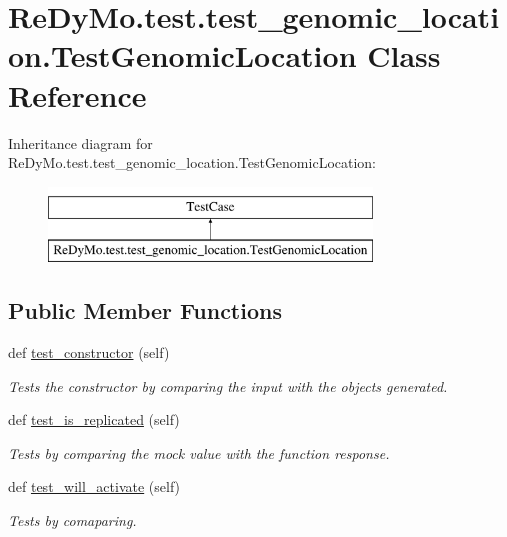 \hypertarget{classReDyMo_1_1test_1_1test__genomic__location_1_1TestGenomicLocation}{}\section{Re\+Dy\+Mo.\+test.\+test\+\_\+genomic\+\_\+location.\+Test\+Genomic\+Location Class Reference}
\label{classReDyMo_1_1test_1_1test__genomic__location_1_1TestGenomicLocation}
Inheritance diagram for Re\+Dy\+Mo.\+test.\+test\+\_\+genomic\+\_\+location.\+Test\+Genomic\+Location\+:\begin{figure}[H]
\begin{center}
\leavevmode
\includegraphics[height=2.000000cm]{classReDyMo_1_1test_1_1test__genomic__location_1_1TestGenomicLocation}
\end{center}
\end{figure}
\subsection*{Public Member Functions}
\begin{DoxyCompactItemize}
\item 
def \mbox{\hyperlink{classReDyMo_1_1test_1_1test__genomic__location_1_1TestGenomicLocation_add11474b7703287f0d310ccb016cfec0}{test\+\_\+constructor}} (self)
\begin{DoxyCompactList}\small\item\em Tests the constructor by comparing the input with the objects generated. \end{DoxyCompactList}\item 
def \mbox{\hyperlink{classReDyMo_1_1test_1_1test__genomic__location_1_1TestGenomicLocation_ada2ce7fa847394f77b6db3f9b1f28445}{test\+\_\+is\+\_\+replicated}} (self)
\begin{DoxyCompactList}\small\item\em Tests by comparing the mock value with the function response. \end{DoxyCompactList}\item 
\mbox{\label{classReDyMo_1_1test_1_1test__genomic__location_1_1TestGenomicLocation_a165c828a38385ae5180c0984203207f9}} 
def \mbox{\hyperlink{classReDyMo_1_1test_1_1test__genomic__location_1_1TestGenomicLocation_a165c828a38385ae5180c0984203207f9}{test\+\_\+will\+\_\+activate}} (self)
\begin{DoxyCompactList}\small\item\em Tests by comaparing. \end{DoxyCompactList}\end{DoxyCompactItemize}


